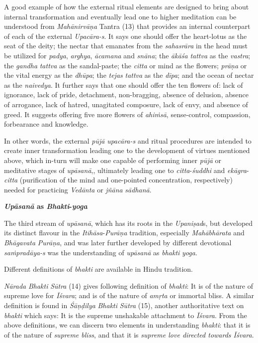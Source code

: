 A good example of how the external ritual elements are designed to bring about internal transformation and eventually lead one to higher meditation can be understood from \emph{Mahānirvāṇa} Tantra (13) that provides an internal counterpart of each of the external \emph{Upacāra-s}. It says one should offer the heart-lotus as the seat of the deity; the nectar that emanates from the \emph{sahasrāra} in the head must be utilized for \emph{padya}, \emph{arghya}, \emph{ācamana} and \emph{snāna}; the \emph{ākāśa} \emph{tattva} as the \emph{vastra}; the \emph{gandha} \emph{tattva} as the sandal-paste; the \emph{citta} or mind as the flowers; \emph{prāṇa} or the vital energy as the \emph{dhūpa}; the \emph{tejas} \emph{tattva} as the \emph{dīpa}; and the ocean of nectar as the \emph{naivedya}. It further says that one should offer the ten flowers of: lack of ignorance, lack of pride, detachment, non-bragging, absence of delusion, absence of arrogance, lack of hatred, unagitated composure, lack of envy, and absence of greed. It suggests offering five more flowers of \emph{ahiṁsā}, sense-control, compassion, forbearance and knowledge.
\vskip 2pt

In other words, the external \emph{pūjā} \emph{upacāra-s} and ritual procedures are intended to create inner transformation leading one to the development of virtues mentioned above, which in-turn will make one capable of performing inner \emph{pūjā} or meditative stages of \emph{upāsanā},, ultimately leading one to \emph{citta}-\emph{śuddhi} and \emph{ekāgra}-\emph{citta} (purification of the mind and one-pointed concentration, respectively) needed for practicing \emph{Vedānta} or \emph{jñāna} \emph{sādhanā}.
\medskip

\textbf{\emph{Upāsanā} as \emph{Bhakti}-\emph{yoga}}

The third stream of \emph{upāsanā}, which has its roots in the \emph{Upaniṣad}s, but developed its distinct flavour in the \emph{Itihāsa}-\emph{Purāṇa} tradition, especially \emph{Mahābhārata} and \emph{Bhāgavata} \emph{Purāṇa}, and was later further developed by different devotional \emph{saṁpradāya-s} was the understanding of \emph{upāsanā} as \emph{bhakti} \emph{yoga}.

Different definitions of \emph{bhakti} are available in Hindu tradition.

\emph{Nārada} \emph{Bhakti} \emph{Sūtra} (14) gives following definition of \emph{bhakti}: It is of the nature of supreme love for \emph{Īśvara}; and is of the nature of \emph{amṛta} or immortal bliss. A similar definition is found in \emph{Śāṇḍilya} \emph{Bhakti} \emph{Sūtra} (15), another authoritative text on \emph{bhakti} which says: It is the supreme unshakable attachment to \emph{Īśvara}. From the above definitions, we can discern two elements in understanding \emph{bhakti}: that it is of the nature of \emph{supreme bliss}, and that it is \emph{supreme love directed towards Īśvara}.

